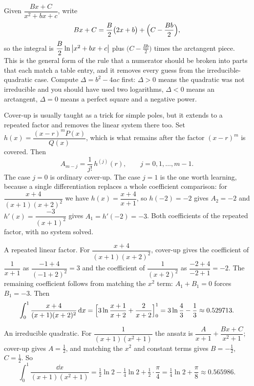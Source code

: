 \begin{keynote}
Given $\dfrac{Bx+C}{x^2+bx+c}$, write
\[
Bx+C=\frac{B}{2}\bigl(2x+b\bigr)+\Bigl(C-\frac{Bb}{2}\Bigr),
\]
so the integral is $\dfrac{B}{2}\ln\left\lvert x^2+bx+c\right\rvert$ plus $\bigl(C-\tfrac{Bb}{2}\bigr)$ times the arctangent piece. This is the general form of the rule that a numerator should be broken into parts that each match a table entry, and it removes every guess from the irreducible-quadratic case. Compute $\Delta=b^2-4ac$ first: $\Delta>0$ means the quadratic was not irreducible and you should have used two logarithms, $\Delta<0$ means an arctangent, $\Delta=0$ means a perfect square and a negative power.
\end{keynote}

\begin{keynote}
Cover-up is usually taught as a trick for simple poles, but it extends to a repeated factor and removes the linear system there too. Set $h(x)=\dfrac{(x-r)^mP(x)}{Q(x)}$, which is what remains after the factor $(x-r)^m$ is covered. Then
\[
A_{m-j}=\frac{1}{j!}\,h^{(j)}(r),\qquad j=0,1,\ldots,m-1 .
\]
The case $j=0$ is ordinary cover-up. The case $j=1$ is the one worth learning, because a single differentiation replaces a whole coefficient comparison: for $\dfrac{x+4}{(x+1)(x+2)^2}$ we have $h(x)=\dfrac{x+4}{x+1}$, so $h(-2)=-2$ gives $A_2=-2$ and $h'(x)=\dfrac{-3}{(x+1)^2}$ gives $A_1=h'(-2)=-3$. Both coefficients of the repeated factor, with no system solved.
\end{keynote}

\begin{worked}
A repeated linear factor. For $\dfrac{x+4}{(x+1)(x+2)^2}$, cover-up gives the coefficient of $\dfrac{1}{x+1}$ as $\dfrac{-1+4}{(-1+2)^2}=3$ and the coefficient of $\dfrac{1}{(x+2)^2}$ as $\dfrac{-2+4}{-2+1}=-2$. The remaining coefficient follows from matching the $x^2$ term: $A_1+B_1=0$ forces $B_1=-3$. Then
\[
\int_0^1\frac{x+4}{(x+1)(x+2)^2}\,\mathrm{d} x=\Bigl[3\ln\frac{x+1}{x+2}+\frac{2}{x+2}\Bigr]_0^1=3\ln\frac43-\frac13\approx0.529713 .
\]

An irreducible quadratic. For $\dfrac{1}{(x+1)(x^2+1)}$ the ansatz is $\dfrac{A}{x+1}+\dfrac{Bx+C}{x^2+1}$; cover-up gives $A=\tfrac12$, and matching the $x^2$ and constant terms gives $B=-\tfrac12$, $C=\tfrac12$. So
\[
\int_0^1\frac{\dd x}{(x+1)(x^2+1)}
=\tfrac12\ln2-\tfrac14\ln2+\tfrac12\cdot\frac{\pi}{4}
=\tfrac14\ln2+\frac{\pi}{8}\approx0.565986 .
\]
\end{worked}

